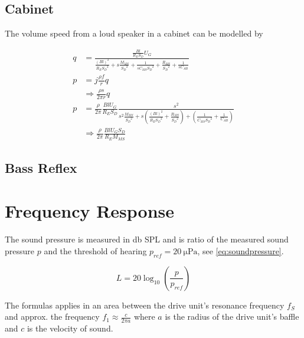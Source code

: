 \subsection{Cabinet}

The volume speed from a loud speaker in a cabinet can be modelled by \

\begin{align}
	q &= \frac{\frac{Bl}{R_E S_D}U_G}{\frac{\left(Bl\right)^2}{R_E {S_D}^2} + s\frac{M_{MS}}{{S_D}^2}+\frac{1}{s C_{MS} {S_D}^2}+\frac{R_{MS}}{{S_D}^2}+\frac{1}{s C_{AB}}} \\
	p &= j\frac{\rho f}{r}q \\
	&\Rightarrow \frac{\rho s}{2\pi r}q \\
	p &= \frac{\rho}{2\pi}\frac{Bl U_G}{R_E S_D}\frac{s^2}{s^2\frac{M_{MS}}{{S_D}^2}+s\left(\frac{\left(Bl\right)^2}{R_E {S_D}^2} + \frac{R_{MS}}{{S_D}^2}\right) + \left(\frac{1}{C_{MS}{S_D}^2} + \frac{1}{C_{AB}}\right)} \\
	&\Rightarrow \frac{\rho}{2\pi}\frac{BlU_G S_D}{R_E M_{MS}}
\end{align}

\subsection{Bass Reflex}

\section{Frequency Response}
The sound pressure is measured in \si{\decibel} SPL and is ratio of the measured sound pressure $p$ and the threshold of hearing $p_{ref}=\SI{20}{\micro\pascal}$, see \cref{eq:soundpressure}.

\begin{equation}
L=20\log_{10}\left(\frac{p}{p_{ref}}\right)
\label{eq:soundpressure}
\end{equation}

The formulas applies in an area between the drive unit's resonance frequency $f_S$ and approx. the frequency $f_1\approx\frac{c}{2\pi a}$ where $a$ is the radius of the drive unit's baffle and $c$ is the velocity of sound. \cite[p.~41]{Elektroakustik}



\FloatBarrier
